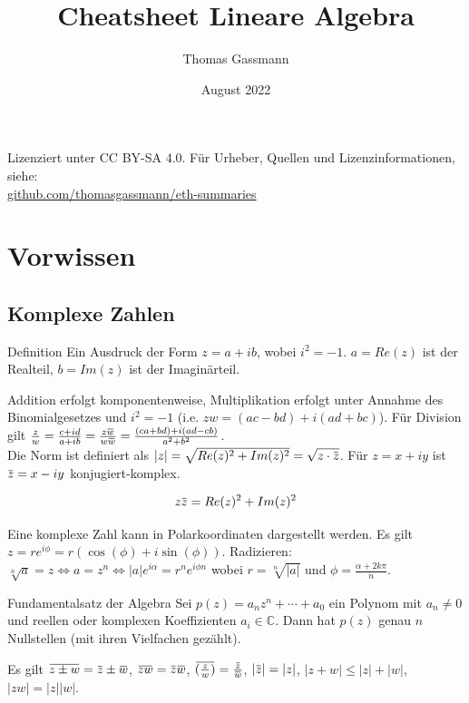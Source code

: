 \documentclass[a4paper,10pt]{article}
\title{Cheatsheet Lineare Algebra}
\author{Thomas Gassmann}
\date{August 2022}
\newcommand{\overbar}[1]{\mkern 1.5mu\overline{\mkern-1.5mu#1\mkern-1.5mu}\mkern 1.5mu}
\begin{document}
\begin{center}
  Lizenziert unter CC BY-SA 4.0. Für Urheber, Quellen und Lizenzinformationen, siehe:\\
  \href{https://github.com/thomasgassmann/eth-summaries}{github.com/thomasgassmann/eth-summaries}
\end{center}

\section{Vorwissen}
\subsection{Komplexe Zahlen}
\begin{mainbox}{Definition}
Ein Ausdruck der Form $z = a + ib$, wobei $i^2 = -1$. $a = Re(z)$ ist der Realteil, $b = Im(z)$ ist der Imaginärteil.
\end{mainbox}

Addition erfolgt komponentenweise, Multiplikation erfolgt unter Annahme des Binomialgesetzes und $i^2 = -1$ (i.e. $z w = (a c - b d) + i (a d + b  c)$). Für Division gilt $\frac{z}{w} = \frac{c + id}{a + ib} = \frac{z\overbar{w}}{w\overbar{w}} = \frac{(ca + bd) + i(ad - cb)}{a^2 + b^2}$.\\
Die Norm ist definiert als $|z| = \sqrt{Re(z)^2 + Im(z)^2} = \sqrt{z \cdot \overbar{z}}$. Für $z = x + iy$ ist $\overbar{z} = x - iy$ konjugiert-komplex.

\begin{subbox}{}
$$z \overbar{z} = Re(z)^2 + Im(z)^2$$
\end{subbox}

Eine komplexe Zahl kann in Polarkoordinaten dargestellt werden. Es gilt $z = re^{i\phi} = r(\cos(\phi) + i\sin(\phi))$.
Radizieren: $\sqrt[n]{a} = z \iff a = z^n \iff |a| e^{i\alpha} = r^n e^{i\phi n}$ wobei $r = \sqrt[n]{|a|}$ und $\phi = \frac{\alpha + 2k\pi}{n}$.

\begin{mainbox}{Fundamentalsatz der Algebra}
  Sei $p(z) = a_n z^n + \cdots + a_0$ ein Polynom mit $a_n \neq 0$ und reellen oder komplexen Koeffizienten $a_i \in \mathbb{C}$. Dann hat $p(z)$ genau $n$ Nullstellen (mit ihren Vielfachen gezählt).
\end{mainbox}

Es gilt $\overbar{z \pm w} = \overbar{z} \pm \overbar{w}$, $\overbar{zw} = \overbar{z}\overbar{w}$, $\overbar{(\frac{z}{w})} = \frac{\overbar{z}}{\overbar{w}}$, $|\overbar{z}| = |z|$, $|z + w| \leq |z| + |w|$, $|zw| = |z| |w|$.
\end{document}
